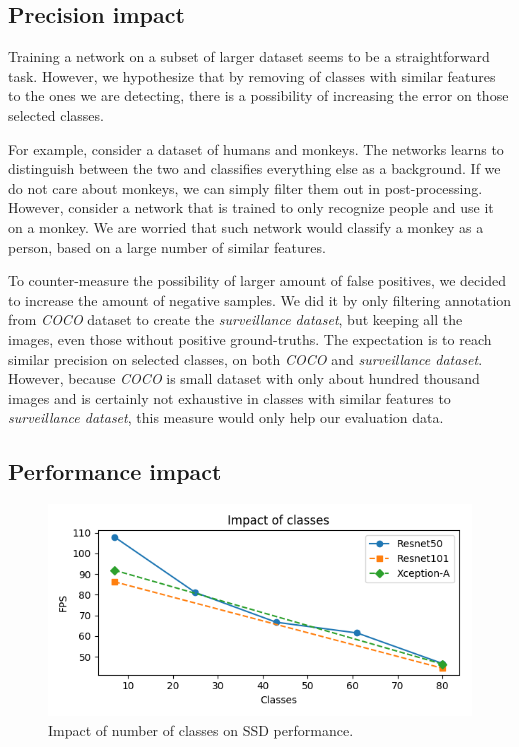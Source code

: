 \subsection{Precision impact}
Training a network on a subset of larger dataset seems to be a straightforward task. However, we hypothesize that by removing of classes with similar features to the ones we are detecting, there is a possibility of increasing the error on those selected classes. 

For example, consider a dataset of humans and monkeys. The networks learns to distinguish between the two and classifies everything else as a background. If we do not care about monkeys, we can simply filter them out in post-processing. However, consider a network that is trained to only recognize people and use it on a monkey. We are worried that such network would classify a monkey as a person, based on a large number of similar features. 

To counter-measure the possibility of larger amount of false positives, we decided to increase the amount of negative samples. We did it by only filtering annotation from \textit{COCO} dataset to create the \textit{surveillance dataset}, but keeping all the images, even those without positive ground-truths. The expectation is to reach similar precision on selected classes, on both \textit{COCO} and \textit{surveillance dataset}. However, because \textit{COCO} is small dataset with only about hundred thousand images and is certainly not exhaustive in classes with similar features to \textit{surveillance dataset}, this measure would only help our evaluation data.



\subsection{Performance impact}
\begin{figure}
    \centering
    \includegraphics[width=\textwidth]{img/fps_class}
    \caption[Impact of number of classes on SSD performance]{Impact of number of classes on SSD performance.}
    \label{fig:fpscls}
\end{figure}



